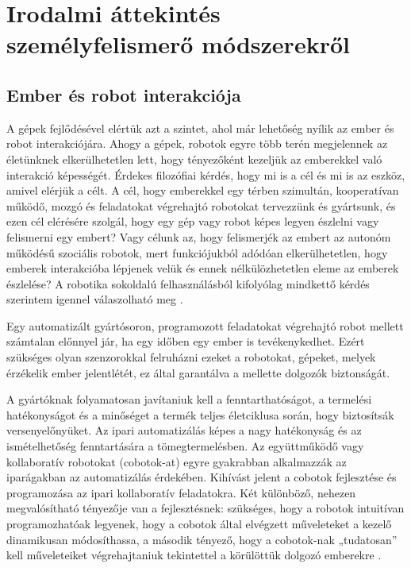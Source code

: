 \chapter{Irodalmi áttekintés személyfelismerő módszerekről}
\label{sec:kutatas}

\section{Ember és robot interakciója}
A gépek fejlődésével elértük azt a szintet, ahol már lehetőség nyílik az ember és robot interakciójára. Ahogy a gépek, robotok egyre több terén megjelennek az életünknek elkerülhetetlen lett, hogy tényezőként kezeljük az emberekkel való interakció képességét. Érdekes filozófiai kérdés, hogy mi is a cél és mi is az eszköz, amivel elérjük a célt. A cél, hogy emberekkel egy térben szimultán, kooperatívan működő, mozgó és feladatokat végrehajtó robotokat tervezzünk és gyártsunk, és ezen cél elérésére szolgál, hogy egy gép vagy robot képes legyen észlelni vagy felismerni egy embert? Vagy célunk az, hogy felismerjék az embert az autonóm működésű szociális robotok, mert funkciójukból adódóan elkerülhetetlen, hogy emberek interakcióba lépjenek velük és ennek nélkülözhetetlen eleme az emberek észlelése? A robotika sokoldalú felhasználásból kifolyólag mindkettő kérdés szerintem igennel válaszolható meg \cite{artc01}.

Egy automatizált gyártósoron, programozott feladatokat végrehajtó robot mellett számtalan előnnyel jár, ha egy időben egy ember is tevékenykedhet. Ezért szükséges olyan szenzorokkal felruházni ezeket a robotokat, gépeket, melyek érzékelik ember jelentlétét, ez által garantálva a mellette dolgozók biztonságát.

A gyártóknak folyamatosan javítaniuk kell a fenntarthatóságot, a termelési hatékonyságot és a minőséget a termék teljes életciklusa során, hogy biztosítsák versenyelőnyüket. Az ipari automatizálás képes a nagy hatékonyság és az ismételhetőség fenntartására a tömegtermelésben. Az együttműködő vagy kollaboratív robotokat (cobotok-at) egyre gyakrabban alkalmazzák az iparágakban az automatizálás érdekében. Kihívást jelent a cobotok fejlesztése és programozása az ipari kollaboratív feladatokra. Két különböző, nehezen megvalósítható tényezője van a fejlesztésnek: szükséges, hogy a robotok intuitívan programozhatóak legyenek, hogy a cobotok által elvégzett műveleteket a kezelő dinamikusan módosíthassa, a második tényező, hogy a cobotok-nak „tudatosan” kell műveleteiket végrehajtaniuk tekintettel a körülöttük dolgozó emberekre \cite{artc020}.


